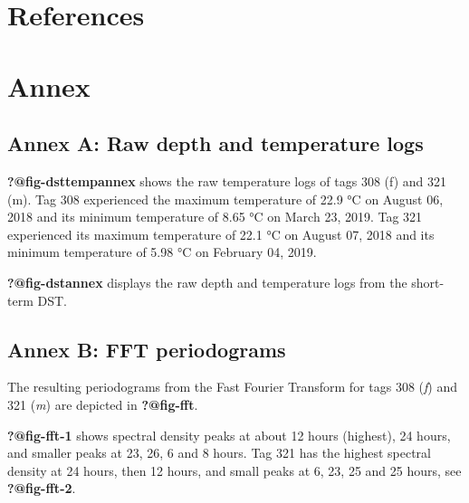 \documentclass[
  authoryear,
  review,
  3p]{elsarticle}
\begin{document}
\newpage{}

\hypertarget{references}{%
\section*{References}\label{references}}

\renewcommand{\bibsection}{}


\hypertarget{annex}{%
\section*{Annex}\label{annex}}

\hypertarget{annex-a-raw-depth-and-temperature-logs}{%
\subsection*{\texorpdfstring{\textbf{Annex A}: Raw depth and temperature
logs}{Annex A: Raw depth and temperature logs}}\label{annex-a-raw-depth-and-temperature-logs}}

\textbf{?@fig-dsttempannex} shows the raw temperature logs of tags 308
(f) and 321 (m). Tag 308 experienced the maximum temperature of 22.9 °C
on August 06, 2018 and its minimum temperature of 8.65 °C on March 23,
2019. Tag 321 experienced its maximum temperature of 22.1 °C on August
07, 2018 and its minimum temperature of 5.98 °C on February 04, 2019.

\textbf{?@fig-dstannex} displays the raw depth and temperature logs from
the short-term DST.

\hypertarget{annex-b-fft-periodograms}{%
\subsection*{\texorpdfstring{\textbf{Annex B}: FFT
periodograms}{Annex B: FFT periodograms}}\label{annex-b-fft-periodograms}}

The resulting periodograms from the Fast Fourier Transform for tags 308
(\emph{f}) and 321 (\emph{m}) are depicted in \textbf{?@fig-fft}.

\textbf{?@fig-fft-1} shows spectral density peaks at about 12 hours
(highest), 24 hours, and smaller peaks at 23, 26, 6 and 8 hours. Tag 321
has the highest spectral density at 24 hours, then 12 hours, and small
peaks at 6, 23, 25 and 25 hours, see \textbf{?@fig-fft-2}.
\end{document}
